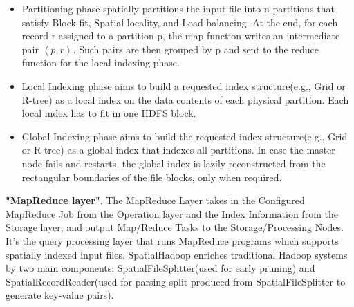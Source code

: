 \documentclass[conference]{IEEEtran}
\begin{document}
	\begin{itemize}
		\item Partitioning phase spatially partitions the input file into n partitions that satisfy Block fit, Spatial locality, and Load balancing. At the end, for each record r assigned to a partition p, the map function writes an intermediate pair $\left\langle p,r\right\rangle $. Such pairs are then grouped by p and sent to the reduce function for the local indexing phase.
		\item Local Indexing phase aims to build a requested index structure(e.g., Grid or R-tree) as a local index on the data contents of each physical partition. Each local index has to fit in one HDFS block.
		\item Global Indexing phase aims to build the requested index structure(e.g., Grid or R-tree) as a global index that indexes all partitions. In case the master node fails and restarts, the global index is lazily reconstructed from the rectangular boundaries of the file blocks, only when required.
	\end{itemize}    
	
 	\textbf{"MapReduce layer"}. The MapReduce Layer takes in the Configured MapReduce Job from the Operation layer and the Index Information from the Storage layer, and output Map/Reduce Tasks to the Storage/Processing Nodes. 
 	It's the query processing layer that runs MapReduce programs which supports spatially indexed input files. SpatialHadoop enriches traditional Hadoop systems by two main components: SpatialFileSplitter(used for early pruning) and SpatialRecordReader(used for parsing split produced from SpatialFileSplitter to generate key-value pairs).
	



	
\end{document}
